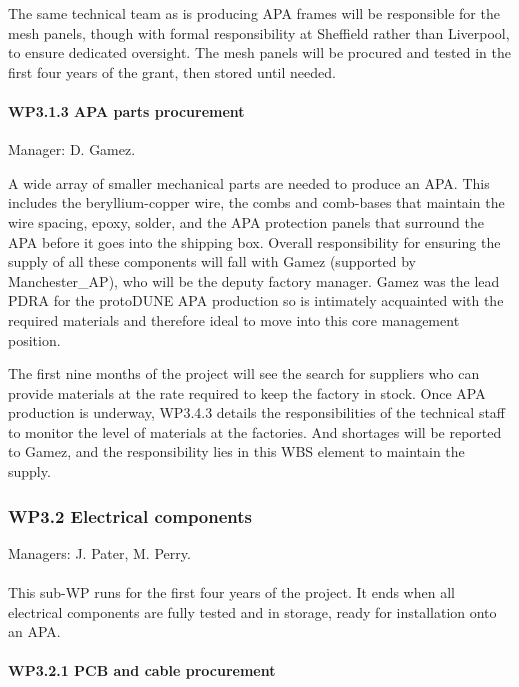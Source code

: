 The same technical team as is producing APA frames will be responsible for the mesh panels, though with formal responsibility at Sheffield rather than Liverpool, to ensure dedicated oversight. The mesh panels will be procured and tested in the first four years of the grant, then stored until needed.

\paragraph{WP3.1.3 APA parts procurement} Manager: D. Gamez.

A wide array of smaller mechanical parts are needed to produce an APA. This includes the beryllium-copper wire, the combs and comb-bases that maintain the wire spacing, epoxy, solder, and the APA protection panels that surround the APA before it goes into the shipping box. Overall responsibility for ensuring the supply of all these components will fall with Gamez (supported by Manchester\_AP), who will be the deputy factory manager. Gamez was the lead PDRA for the protoDUNE APA production so is intimately acquainted with the required materials and therefore ideal to move into this core management position.

The first nine months of the project will see the search for suppliers who can provide materials at the rate required to keep the factory in stock. Once APA production is underway, WP3.4.3 details the responsibilities of the technical staff to monitor the level of materials at the factories. And shortages will be reported to Gamez, and the responsibility lies in this WBS element to maintain the supply.

\subsubsection{WP3.2 Electrical components}

Managers: J. Pater, M. Perry.\\
\\ This sub-WP runs for the first four years of the project. It ends when all electrical components are fully tested and in storage, ready for installation onto an APA.

\paragraph{WP3.2.1 PCB and cable procurement}

